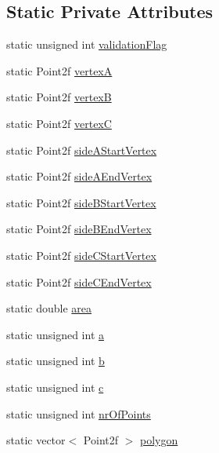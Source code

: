 \subsection*{Static Private Attributes}
\begin{DoxyCompactItemize}
\item 
static unsigned int \hyperlink{classmultiscale_1_1MinimumAreaEnclosingTriangle_abf0daf5b56e3050cbbe70f5d95402cc2}{validation\-Flag}
\item 
static Point2f \hyperlink{classmultiscale_1_1MinimumAreaEnclosingTriangle_a08e1e2f1a682598a8b336d63654f4628}{vertex\-A}
\item 
static Point2f \hyperlink{classmultiscale_1_1MinimumAreaEnclosingTriangle_af54ab74d9af976d7308463a334ae1dda}{vertex\-B}
\item 
static Point2f \hyperlink{classmultiscale_1_1MinimumAreaEnclosingTriangle_a57010dcbfa3ff916815df80663f704bc}{vertex\-C}
\item 
static Point2f \hyperlink{classmultiscale_1_1MinimumAreaEnclosingTriangle_a29a7a1a4b8cf544dbd7ccb75f653587e}{side\-A\-Start\-Vertex}
\item 
static Point2f \hyperlink{classmultiscale_1_1MinimumAreaEnclosingTriangle_abab8794502794dcbfc4b9336734ecae8}{side\-A\-End\-Vertex}
\item 
static Point2f \hyperlink{classmultiscale_1_1MinimumAreaEnclosingTriangle_a01c5a1d51bf85edcd3b9498192b5c70e}{side\-B\-Start\-Vertex}
\item 
static Point2f \hyperlink{classmultiscale_1_1MinimumAreaEnclosingTriangle_a4183750a67cc95d70695820376a52453}{side\-B\-End\-Vertex}
\item 
static Point2f \hyperlink{classmultiscale_1_1MinimumAreaEnclosingTriangle_a9c227b89fcf6afe2f6fe0bb842c47518}{side\-C\-Start\-Vertex}
\item 
static Point2f \hyperlink{classmultiscale_1_1MinimumAreaEnclosingTriangle_a08dbbe5cf66a72a3f973dc0b34526f86}{side\-C\-End\-Vertex}
\item 
static double \hyperlink{classmultiscale_1_1MinimumAreaEnclosingTriangle_a8631cd58e7083b9ed99a1ad173e2694d}{area}
\item 
static unsigned int \hyperlink{classmultiscale_1_1MinimumAreaEnclosingTriangle_a982681b52b0d6c14fa4a193165639469}{a}
\item 
static unsigned int \hyperlink{classmultiscale_1_1MinimumAreaEnclosingTriangle_a88aa912aa1199f163d60b2a11c3948aa}{b}
\item 
static unsigned int \hyperlink{classmultiscale_1_1MinimumAreaEnclosingTriangle_a8de6adbe07fa09cefefd31b84e7e6ef3}{c}
\item 
static unsigned int \hyperlink{classmultiscale_1_1MinimumAreaEnclosingTriangle_ae9024f754f845334dc9dd74ce8e104a9}{nr\-Of\-Points}
\item 
static vector$<$ Point2f $>$ \hyperlink{classmultiscale_1_1MinimumAreaEnclosingTriangle_ae00ebcf0a1f6bb966d9735a4be44a2f3}{polygon}
\end{DoxyCompactItemize}


